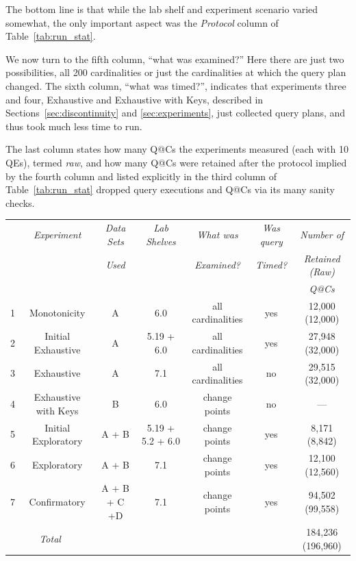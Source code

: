 \documentclass[prodmode,acmtods]{acmsmall}
\begin{document}
The bottom line is that while the lab shelf and experiment scenario varied
somewhat, the only important aspect was the {\em Protocol} column of
Table~\ref{tab:run_stat}.

We now turn to the fifth column, ``what was examined?'' Here there are just two
possibilities, all 200 cardinalities or just the cardinalities at which the
query plan changed. The sixth column, ``what was timed?'', indicates that experiments three and four, Exhaustive and
Exhaustive with Keys, described in Sections~\ref{sec:discontinuity} and \ref{sec:experiments}, just
collected query plans, and thus took much less time to run.

The last column states how many Q@Cs the experiments measured (each with 10
QEs), termed {\em raw}, and how many Q@Cs were retained after the protocol
implied by the fourth column and listed explicitly in the third column of
Table~\ref{tab:run_stat} dropped query executions and Q@Cs via its many
  sanity checks.

\begin{table}[t]
{%
\resizebox{140mm}{!}
{
\begin{tabular}{c|c|c|c|c|c|c}
& {\em Experiment}& {\em Data Sets} & {\em Lab Shelves} & {\em What was} &{\em Was query}&{\em Number of}\\
&                 & {\em Used}      &                   & {\em Examined?}&{\em Timed?}   &{\em Retained (Raw)}\\
&&&&&& {\em Q@Cs}\\
\hline
1 & Monotonicity 	& A & 6.0     &all cardinalities&yes& 12,000 (12,000)\\
2 & Initial Exhaustive 	& A & 5.19 + 6.0&all cardinalities&yes& 27,948 (32,000)\\
3 & Exhaustive 		& A & 7.1     &all cardinalities&no & 29,515 (32,000)\\
4 & Exhaustive with Keys & B& 6.0     &change points   &no& --- \\
5 & Initial Exploratory & A + B&5.19 + 5.2 + 6.0&change points&yes& 8,171 (8,842)\\
6 & Exploratory 	& A + B&7.1   &change points   &yes& 12,100 (12,560)\\
7 & Confirmatory 	&A + B + C +D&7.1&change points&yes& 94,502 (99,558)\\
\multicolumn{2}{c|}{\em Total}         &            & &               &   & 184,236 (196,960)\\
\end{tabular}
}
}
\end{table}
\end{document}
